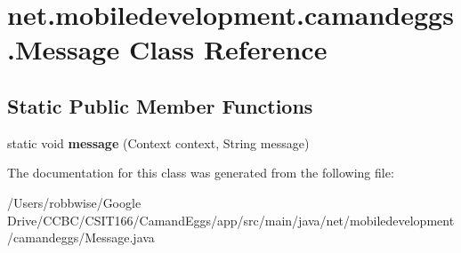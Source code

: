 \hypertarget{classnet_1_1mobiledevelopment_1_1camandeggs_1_1_message}{}\section{net.\+mobiledevelopment.\+camandeggs.\+Message Class Reference}
\label{classnet_1_1mobiledevelopment_1_1camandeggs_1_1_message}
\subsection*{Static Public Member Functions}
\begin{DoxyCompactItemize}
\item 
\mbox{\label{classnet_1_1mobiledevelopment_1_1camandeggs_1_1_message_a4747588bc5300eda5350425cf9114151}} 
static void {\bfseries message} (Context context, String message)
\end{DoxyCompactItemize}


The documentation for this class was generated from the following file\+:\begin{DoxyCompactItemize}
\item 
/\+Users/robbwise/\+Google Drive/\+C\+C\+B\+C/\+C\+S\+I\+T166/\+Camand\+Eggs/app/src/main/java/net/mobiledevelopment/camandeggs/Message.\+java\end{DoxyCompactItemize}
